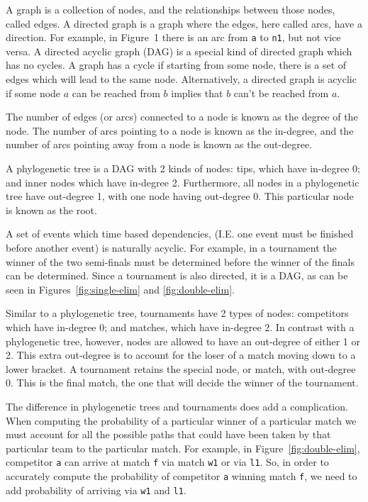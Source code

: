 \documentclass{article}
\begin{document}
A graph is a collection of nodes, and the relationships between those nodes, called edges. A directed graph is a graph
where the edges, here called arcs, have a direction. For example, in Figure~1 there is an arc from \texttt{a} to
\texttt{n1}, but not vice versa. A directed acyclic graph (DAG) is a special kind of directed graph which has no cycles. A
graph has a cycle if starting from some node, there is a set of edges which will lead to the same node. Alternatively,
a directed graph is acyclic if some node $a$ can be reached from $b$ implies that $b$ can't be reached from $a$.

The number of edges (or arcs) connected to a node is known as the degree of the node. The number of arcs pointing to a
node is known as the in-degree, and the number of arcs pointing away from a node is known as the out-degree.

A phylogenetic tree is a DAG with 2 kinds of nodes: tips, which have in-degree 0; and inner nodes which have in-degree
2. Furthermore, all nodes in a phylogenetic tree have out-degree 1, with one node having out-degree 0. This particular
node is known as the root.

A set of events which time based dependencies, (I.E. one event must be finished before another event) is naturally
acyclic. For example, in a tournament the winner of the two semi-finals must be determined before the winner of the
finals can be determined. Since a tournament is also directed, it is a DAG, as can be seen in
Figures~\ref{fig:single-elim} and \ref{fig:double-elim}.

Similar to a phylogenetic tree, tournaments have 2 types of nodes: competitors which have in-degree 0; and matches,
which have in-degree 2. In contrast with a phylogenetic tree, however, nodes are allowed to have an out-degree of either
1 or 2. This extra out-degree is to account for the loser of a match moving down to a lower bracket. A tournament
retains the special node, or match, with out-degree 0. This is the final match, the one that will decide the winner
of the tournament.

The difference in phylogenetic trees and tournaments does add a complication. When computing the probability of a
particular winner of a particular match we must account for all the possible paths that could have been taken by that
particular team to the particular match. For example, in Figure~\ref{fig:double-elim}, competitor \texttt{a} can arrive
at match \texttt{f} via match \texttt{w1} or via \texttt{l1}. So, in order to accurately compute the probability of
competitor \texttt{a} winning match \texttt{f}, we need to add probability of arriving via \texttt{w1} and \texttt{l1}.
\end{document}
